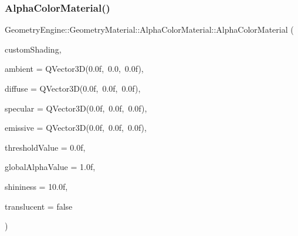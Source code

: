 \subsubsection{\texorpdfstring{AlphaColorMaterial()}{AlphaColorMaterial()}\hspace{0.1cm}{\footnotesize\ttfamily [1/2]}}
{\footnotesize\ttfamily Geometry\+Engine\+::\+Geometry\+Material\+::\+Alpha\+Color\+Material\+::\+Alpha\+Color\+Material (\begin{DoxyParamCaption}\item[{const \mbox{\hyperlink{class_geometry_engine_1_1_custom_shading_1_1_custom_shading_interface}{Custom\+Shading\+::\+Custom\+Shading\+Interface}} $\ast$const}]{custom\+Shading,  }\item[{const Q\+Vector3D \&}]{ambient = {\ttfamily QVector3D(0.0f,~0.0,~0.0f)},  }\item[{const Q\+Vector3D \&}]{diffuse = {\ttfamily QVector3D(0.0f,~0.0f,~0.0f)},  }\item[{const Q\+Vector3D \&}]{specular = {\ttfamily QVector3D(0.0f,~0.0f,~0.0f)},  }\item[{const Q\+Vector3D \&}]{emissive = {\ttfamily QVector3D(0.0f,~0.0f,~0.0f)},  }\item[{float}]{threshold\+Value = {\ttfamily 0.0f},  }\item[{float}]{global\+Alpha\+Value = {\ttfamily 1.0f},  }\item[{float}]{shininess = {\ttfamily 10.0f},  }\item[{bool}]{translucent = {\ttfamily false} }\end{DoxyParamCaption})}

